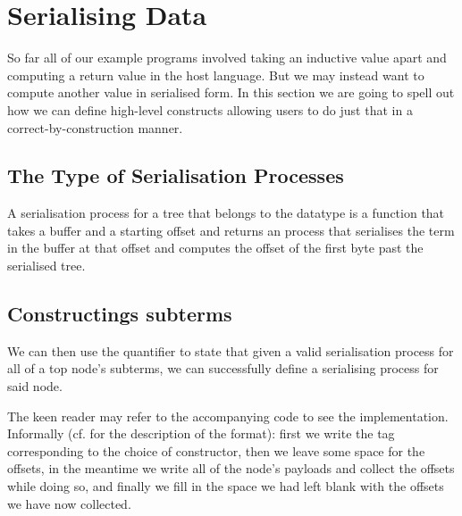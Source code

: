 \section{Serialising Data}\label{sec:serialising}

So far all of our example programs involved taking an inductive value
apart and computing a return value in the host language.
%
But we may instead want to compute another value in serialised form.
%
In this section we are going to spell out how we can define high-level
constructs allowing users to do just that in a correct-by-construction
manner.

\label{fig:serialised-map}


\subsection{The Type of Serialisation Processes}

A serialisation process for a tree  that belongs to the
datatype  is a function that takes a buffer
and a starting offset and returns an  process that
serialises the term in the buffer at that offset and computes the
offset of the first byte past the serialised tree.



\subsection{Constructings subterms}


We can then use the  quantifier to state that given a
valid serialisation process for all of a top node's subterms, we can
successfully define a serialising process for said node.


The keen reader may refer to the accompanying code to see the implementation.
Informally (cf.  for the description of the format):
first we write the tag corresponding to the choice of constructor,
then we leave some space for the offsets,
in the meantime we write all of the node's payloads and collect the offsets while doing so,
and finally we fill in the space we had left blank with the offsets we have now collected.

